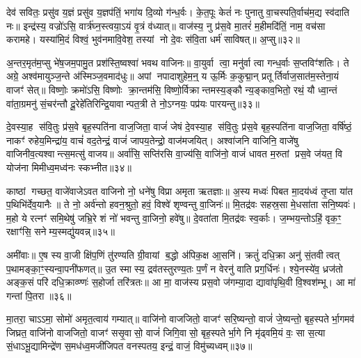 {\anuvakamend[{यः स मा॒शिषं॑ गृहपत॒ इत्या॑ह॒ यस्य॑ पु॒त्रो व्र॒तमे॒व खलु॒ वै चतु॑र्विशतिश्च॥६॥}]}

देव॑ सवितः॒ प्रसु॑व य॒ज्ञं प्रसु॑व य॒ज्ञप॑तिं॒ भगा॑य दि॒व्यो ग॑न्ध॒र्वः। के॒त॒पूः केतं॑ नः पुनातु वा॒चस्पति॒र्वाच॑म॒द्य स्व॑दाति नः॥ इन्द्र॑स्य॒ वज्रो॑ऽसि॒ वार्त्र॑घ्न॒स्त्वया॒ऽयं वृ॒त्रं व॑ध्यात्॥ वाज॑स्य॒ नु प्र॑स॒वे मा॒तरं॑ म॒हीमदि॑तिं॒ नाम॒ वच॑सा करामहे। यस्या॑मि॒दं विश्वं॒ भुव॑नमावि॒वेश॒ तस्यां नो दे॒वः स॑वि॒ता धर्म॑ साविषत्॥ अ॒प्सु॥३२॥

अ॒न्तर॒मृत॑म॒प्सु भे॑ष॒जम॒पामु॒त प्रश॑स्ति॒ष्वश्वा॑ भवथ वाजिनः॥ वा॒युर्वा त्वा॒ मनु॑र्वा त्वा गन्ध॒र्वाः स॒प्तविꣳ॑शतिः। ते अग्रे॒ अश्व॑मायुञ्ज॒न्ते अ॑स्मिञ्ज॒वमाद॑धुः॥ अपां नपादाशुहेम॒न्॒ य ऊ॒र्मिः क॒कुद्मा॒न् प्रतूर्तिर्वाज॒सात॑म॒स्तेना॒यं वाजꣳ॑ सेत्॥ विष्णोः॒ क्रमो॑ऽसि॒ विष्णोः क्रा॒न्तम॑सि॒ विष्णो॒र्विक्रान्तमस्य॒ङ्कौ न्य॒ङ्काव॒भितो॒ रथं॒ यौ ध्वा॒न्तं वा॑ता॒ग्रमनु॑ सं॒चर॑न्तौ दू॒रेहे॑तिरिन्द्रि॒यावान्पत॒त्री ते नो॒ऽग्नयः॒ पप्र॑यः पारयन्तु॥३३॥

{\anuvakamend[{अ॒प्सु न्य॒ङ्कौ पञ्च॑दश च॥७॥}]}

दे॒वस्या॒ह स॑वि॒तुः प्र॑स॒वे बृह॒स्पति॑ना वाज॒जिता॒ वाजं॑ जेषं दे॒वस्या॒ह स॑वि॒तुः प्र॑स॒वे बृह॒स्पति॑ना वाज॒जिता॒ वर्\mbox{}षि॑ष्ठं॒ नाकꣳ॑ रुहेय॒मिन्द्रा॑य॒ वाचं॑ वद॒तेन्द्रं॒ वाजं॑ जापय॒तेन्द्रो॒ वाज॑मजयित्। अश्वा॑जनि वाजिनि॒ वाजे॑षु वाजिनीव॒त्यश्वान्त्स॒मत्सु॑ वाजय॥ अर्वा॑सि॒ सप्ति॑रसि वा॒ज्य॑सि॒ वाजि॑नो॒ वाजं॑ धावत म॒रुतां प्रस॒वे ज॑यत॒ वि योज॑ना मिमीध्व॒मध्व॑नः स्कभ्नीत॥३४॥

काष्ठां गच्छत॒ वाजे॑वाजेऽवत वाजिनो नो॒ धने॑षु विप्रा अमृता ऋतज्ञाः॥ अ॒स्य मध्वः॑ पिबत मा॒दय॑ध्वं तृ॒प्ता या॑त प॒थिभि॑र्देव॒यानैः॥ ते नो॒ अर्व॑न्तो हवन॒श्रुतो॒ हवं॒ विश्वे॑ शृण्वन्तु वा॒जिनः॑॥ मि॒तद्र॑वः सहस्र॒सा मे॒धसा॑ता सनि॒ष्यवः॑। म॒हो ये रत्नꣳ॑ समि॒थेषु॑ जभ्रि॒रे शं नो॑ भवन्तु वा॒जिनो॒ हवे॑षु॥ दे॒वता॑ता मि॒तद्र॑वः स्व॒र्काः। ज॒म्भय॒न्तोऽहिं॒ वृक॒ꣳ॒ रक्षाꣳ॑सि॒ सनेम्य॒स्मद्यु॑यवन्न्॥३५॥

अमी॑वाः॥ ए॒ष स्य वा॒जी क्षि॑प॒णिं तु॑रण्यति ग्री॒वायां ब॒द्धो अ॑पिक॒क्ष आ॒सनि॑। क्रतुं॑ दधि॒क्रा अनु॑ सं॒तवीत्वत् प॒थामङ्का॒ꣳ॒स्यन्वा॒पनी॑फणत्॥ उ॒त स्मास्य॒ द्रव॑तस्तुरण्य॒तः प॒र्णं न वेरनु॑ वाति प्रग॒र्धिनः॑। श्ये॒नस्ये॑व॒ ध्रज॑तो अङ्क॒सं परि॑ दधि॒क्राव्ण्णः॑ स॒होर्जा तरि॑त्रतः॥ आ मा॒ वाज॑स्य प्रस॒वो ज॑गम्या॒दा द्यावा॑पृथि॒वी वि॒श्वश॑म्भू। आ मा॑ गन्तां पि॒तरा॥३६॥

मा॒तरा॒ चाऽऽमा॒ सोमो॑ अमृत॒त्वाय॑ गम्यात्॥ वाजि॑नो वाजजितो॒ वाजꣳ॑ सरि॒ष्यन्तो॒ वाजं॑ जे॒ष्यन्तो॒ बृह॒स्पतेर्भा॒गमव॑ जिघ्रत॒ वाजि॑नो वाजजितो॒ वाजꣳ॑ ससृ॒वासो॒ वाजं॑ जिगि॒वासो॒ बृह॒स्पतेर्भा॒गे नि मृ॑ढ्वमि॒यं वः॒ सा स॒त्या सं॒धाऽभू॒द्यामिन्द्रे॑ण स॒मध॑ध्व॒मजी॑जिपत वनस्पतय॒ इन्द्रं॒ वाजं॒ विमु॑च्यध्वम्॥३७॥

